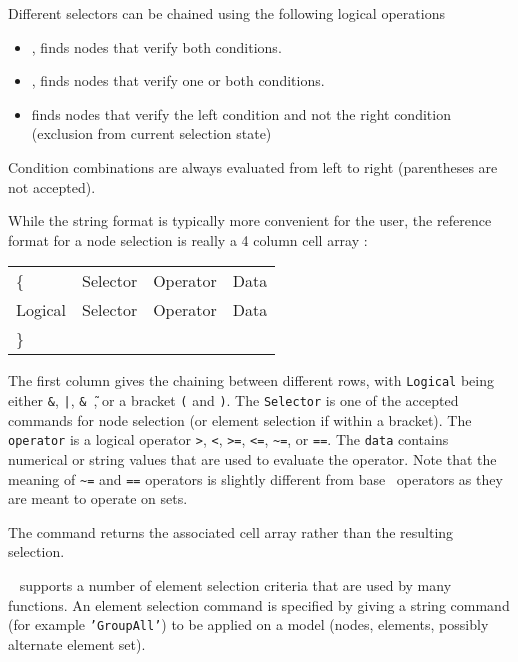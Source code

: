 Different selectors can be chained using the following logical operations
\begin{itemize}
\item \ts{\&}, finds nodes that verify both conditions.
\item \ts{|}, finds nodes that verify one or both conditions.
\item \ts{\&\~\ } finds nodes that verify the left condition and not the right condition (exclusion from current selection state)
\end{itemize}
Condition combinations are always evaluated from left to right (parentheses are not accepted).

While the string format is typically more convenient for the user, the reference format for a node selection is really a 4 column cell array :

\begin{tabular}{@{}p{}@{}p{}@{}p{}@{}p{}@{}}
    \{ & Selector & Operator & Data \\
Logical & Selector & Operator & Data \\
\} & &  &  \\
\end{tabular}

The first column gives the chaining between different rows, with {\tt Logical} being either {\tt \&}, {\tt |}, {\tt \&\~\ }, or a bracket {\tt (} and {\tt )}. The {\tt Selector} is one of the accepted commands for node selection (or element selection if within a bracket). The {\tt operator} is a logical operator {\tt >}, {\tt <}, {\tt >=}, {\tt <=},  {\tt \verb+~+=}, or {\tt ==}. The {\tt data} contains numerical or string values that are used to evaluate the operator. Note that the meaning of {\tt \verb+~+=} and {\tt ==} operators is slightly different from base \matlab\ operators as they are meant to operate on sets. 


The  command returns the associated cell array rather than the resulting selection.


\newpage

\feutil\  supports a number of element selection criteria that are used by many functions. An element selection command is specified by giving a string command (for example {\tt 'GroupAll'}) to be applied on a model (nodes, elements, possibly alternate element set).

